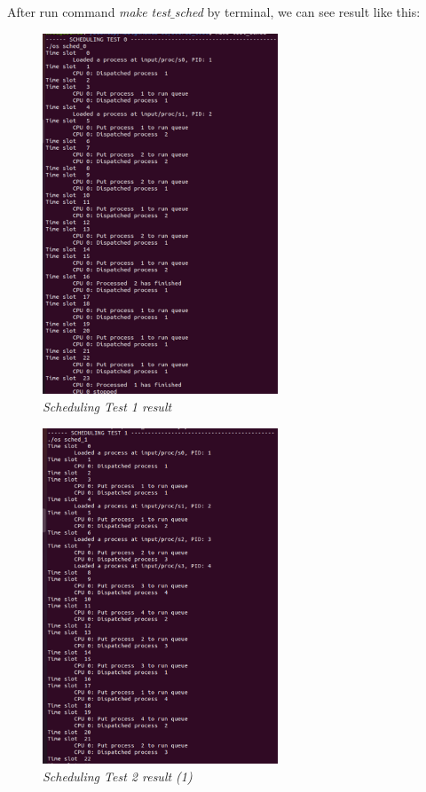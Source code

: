 \documentclass[13pt,a4paper]{article}
\begin{document}
			After run command \textit{make test$\_$sched} by terminal, we can see result like this:
			\begin{figure}[h!]
				\begin{center}
					\includegraphics[width=7cm]{test_sched_1.png}
					\caption{\textit{Scheduling Test 1 result}}
				\end{center}
			\end{figure}
			\newpage
			\begin{figure}[h!]
				\begin{center}
					\includegraphics[width=7cm]{test_sched_2_1.png}
					\caption{\textit{Scheduling Test 2 result (1)}}
				\end{center}
			\end{figure}
\end{document}
